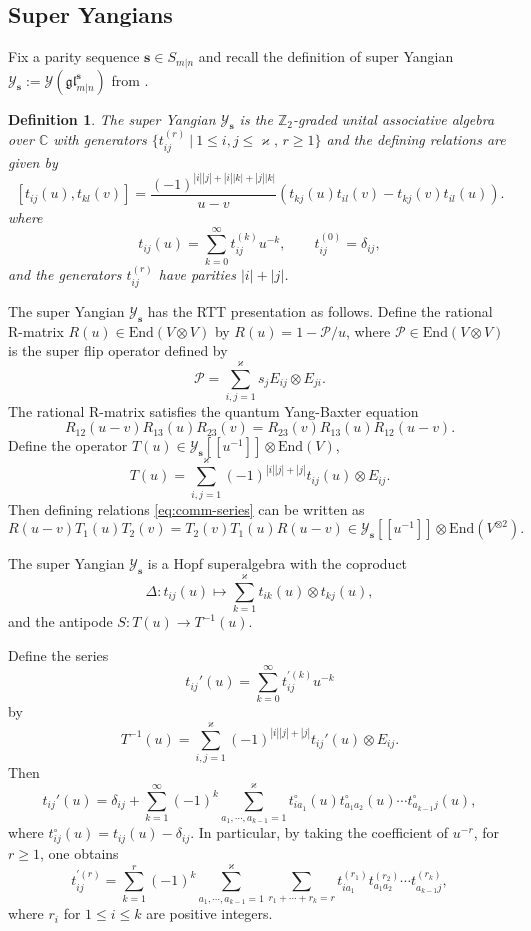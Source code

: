 \documentclass[11pt,reqno]{amsart}
\numberwithin{equation}{section}
\newtheorem{dfn}[thm]{Definition}
\theoremstyle{definition}
\theoremstyle{remark}
\newcommand{\beq}{\begin{equation}}
\newcommand{\eeq}{\end{equation}}
\newcommand{\C}{\mathbb{C}}
\newcommand{\Z}{\mathbb{Z}}
\newcommand{\mc}{\mathcal}
\newcommand{\End}{\mathrm{End}}
\newcommand{\gge}{\geqslant}
\newcommand{\lle}{\leqslant}
\newcommand{\YglMN}{\mathscr{Y}_{\bm s}}
\newcommand{\ka}{\varkappa}
\newcommand{\s}{{\bm s}}
\begin{document}
\subsection{Super Yangians}\label{sec rtt}
Fix a parity sequence $\bm s\in S_{m|n}$ and recall the definition of super Yangian $\YglMN:=\mathscr Y(\mathfrak{gl}_{m|n}^\s)$ from \cite{Nazarov1991berezinian}.

\begin{dfn}The super Yangian $\YglMN$ is the $\Z_2$-graded unital associative algebra over $\C$ with generators $\{t_{ij}^{(r)}\ |\ 1\lle i,j \lle\ka, \, r\gge 1\}$ and the defining relations are given by
\beq\label{eq:comm-series}
[t_{ij}(u),t_{kl}(v)]=\frac{(-1)^{|i||j|+|i||k|+|j||k|}}{u-v}(t_{kj}(u)t_{il}(v)-t_{kj}(v)t_{il}(u)).
\eeq
where
\[
t_{ij}(u)=\sum_{k=0}^\infty t_{ij}^{(k)}u^{-k},\qquad t_{ij}^{(0)}=\delta_{ij},
\]
and the generators $t_{ij}^{(r)}$ have parities $|i|+|j|$.
\end{dfn}
The super Yangian $\YglMN$ has the RTT presentation as follows. Define the rational R-matrix $R(u)\in \End(V \otimes  V)$ by $R(u)=1-\mathcal P/u$, where $\mc P\in \End(V \otimes V)$ is the super flip operator defined by
\[
\mathcal P=\sum_{i,j=1}^\ka s_jE_{ij}\otimes E_{ji}.
\]
The rational R-matrix satisfies the quantum Yang-Baxter equation
\beq\label{eq yang-baxter}
R_{12}(u-v)R_{13}(u)R_{23}(v)=R_{23}(v)R_{13}(u)R_{12}(u-v).
\eeq
Define the operator $T(u)\in \YglMN[[u^{-1}]]\otimes \End(V) $,
$$
T(u)=\sum_{i,j=1}^\ka (-1)^{|i||j|+|j|} t_{ij}(u)\otimes E_{ij}.
$$
Then defining relations \eqref{eq:comm-series} can be written as
\beq\label{eq:RTT}
R(u-v)T_1(u)T_2(v)=T_2(v)T_1(u)R(u-v)\in  \YglMN[[u^{-1}]]\otimes\End(V^{\otimes 2}).
\eeq



The super Yangian $\YglMN$ is a Hopf superalgebra with the coproduct
\beq\label{eq Hopf}
\Delta: t_{ij}(u)\mapsto \sum_{k=1}^\ka t_{ik}(u)\otimes t_{kj}(u),
\eeq
and the antipode $S:T(u)\to T^{-1}(u)$.

Define the series
$$
t_{ij}'(u)=\sum_{k=0}^\infty {t}_{ij}^{\prime( k)}u^{-k}
$$
by
\beq\label{eq:inverseT}
T^{-1}(u)=\sum_{i,j=1}^\ka (-1)^{|i||j|+|j|}  t_{ij}'(u)\otimes E_{ij}.
\eeq
Then
\beq\label{eq:T'-expression}
t_{ij}'(u)=\delta_{ij}+\sum_{k=1}^\infty (-1)^k\sum_{a_1,\cdots,a_{k-1}=1}^\ka t_{ia_1}^\circ(u)t_{a_1a_2}^\circ(u)\cdots t_{a_{k-1}j}^\circ(u),
\eeq
where $t_{ij}^\circ(u)=t_{ij}(u)-\delta_{ij}$. In particular, by taking the coefficient of $u^{-r}$, for $r\gge 1$, one obtains
\beq\label{eq:T-expression-comp}
t_{ij}^{\prime(r)}=\sum_{k=1}^r (-1)^k\sum_{a_1,\cdots,a_{k-1}=1}^\ka\sum_{r_1+\cdots+r_k=r}t_{ia_1}^{(r_1)}t_{a_1a_2}^{(r_2)}\cdots t_{a_{k-1}j}^{(r_k)},
\eeq
where $r_i$ for $1\lle i\lle k$ are positive integers.
\end{document}
